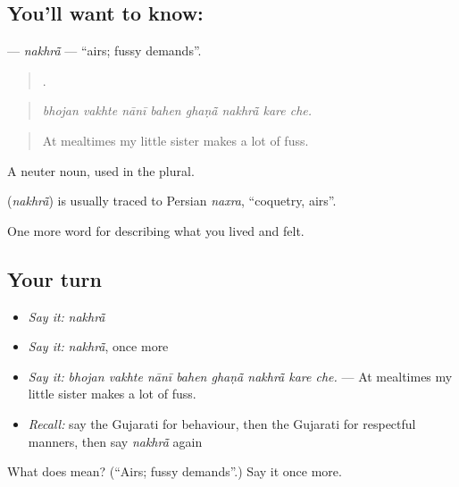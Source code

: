 \subsection*{You'll want to know: }
\textbf{} — \emph{nakhrā̃} — \textquotedblleft{}airs; fussy demands\textquotedblright{}.

\begin{quote}
       .
\end{quote}

\begin{quote}
\emph{bhojan vakhte nānī bahen ghaṇā̃ nakhrā̃ kare che.}
\end{quote}

\begin{quote}
At mealtimes my little sister makes a lot of fuss.
\end{quote}

A neuter noun, used in the plural.

\begin{cousinweb}
\textbf{} (\emph{nakhrā̃}) is usually traced to Persian \emph{naxra}, \textquotedblleft{}coquetry, airs\textquotedblright{}.
\end{cousinweb}

\begin{grammarlens}[title={What you've built}]
One more word for describing what you lived and felt.
\end{grammarlens}

\subsection*{Your turn}
\begin{itemize}
\raggedright
  \item \emph{Say it:} \emph{nakhrā̃}
  \item \emph{Say it:} \emph{nakhrā̃}, once more
  \item \emph{Say it:} \emph{bhojan vakhte nānī bahen ghaṇā̃ nakhrā̃ kare che.} — At mealtimes my little sister makes a lot of fuss.
  \item \emph{Recall:} say the Gujarati for behaviour, then the Gujarati for respectful manners, then say \emph{nakhrā̃} again
\end{itemize}

\begin{tcolorbox}[breakable,colback=teal!4,colframe=teal!35!black,title={Before you move on}]
What does  mean? (\textquotedblleft{}Airs; fussy demands\textquotedblright{}.) Say it once more.
\end{tcolorbox}
